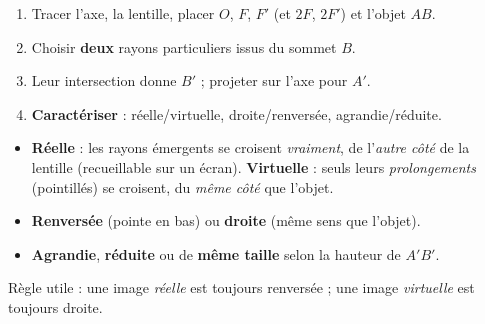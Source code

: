 \documentclass[11pt,a4paper]{article}
\begin{document}
\begin{methode}
\begin{enumerate}[leftmargin=1.7em,topsep=2pt,itemsep=1pt]
  \item Tracer l'axe, la lentille, placer $O$, $F$, $F'$ (et $2F$, $2F'$) et l'objet $AB$.
  \item Choisir \textbf{deux} rayons particuliers issus du sommet $B$.
  \item Leur intersection donne $B'$ ; projeter sur l'axe pour $A'$.
  \item \textbf{Caractériser} : réelle/virtuelle, droite/renversée, agrandie/réduite.
\end{enumerate}
\end{methode}

\begin{cle}
\begin{itemize}[leftmargin=1.5em,topsep=2pt,itemsep=1pt]
  \item \textbf{Réelle} : les rayons émergents se croisent \emph{vraiment}, de l'\emph{autre côté} de la
        lentille (recueillable sur un écran). \textbf{Virtuelle} : seuls leurs \emph{prolongements}
        (pointillés) se croisent, du \emph{même côté} que l'objet.
  \item \textbf{Renversée} (pointe en bas) ou \textbf{droite} (même sens que l'objet).
  \item \textbf{Agrandie}, \textbf{réduite} ou de \textbf{même taille} selon la hauteur de $A'B'$.
\end{itemize}
Règle utile : une image \emph{réelle} est toujours renversée ; une image \emph{virtuelle} est
toujours droite.
\end{cle}
\end{document}
